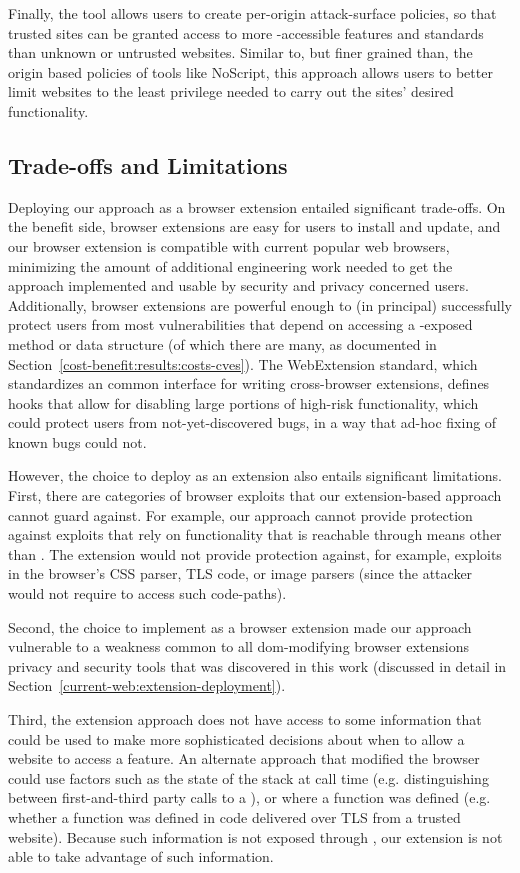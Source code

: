 Finally, the tool allows users to create per-origin attack-surface policies,
so that trusted sites can be granted access to more \JS-accessible
features and standards than unknown or untrusted websites.  Similar to, but
finer grained than, the origin based policies of tools like NoScript, this
approach allows users to better limit websites to the least privilege
needed to carry out the sites' desired functionality.


\subsection{Trade-offs and Limitations}
Deploying our approach as a browser extension entailed significant trade-offs.
On the benefit side, browser extensions are easy for users to install and update,
and our browser extension is compatible with current popular web browsers,
minimizing the amount of additional engineering work needed to get the approach
implemented and usable by security and privacy concerned users.  Additionally,
browser extensions are powerful enough to (in principal) successfully protect
users from most vulnerabilities that depend on accessing a \JS-exposed method
or data structure (of which there are many, as documented in
Section~\ref{cost-benefit:results:costs-cves}).  The WebExtension standard, which
standardizes an common interface for writing cross-browser extensions,
defines hooks that allow for disabling large portions of high-risk
functionality, which could protect users from not-yet-discovered bugs, in a way
that ad-hoc fixing of known bugs could not.

However, the choice to deploy as an extension also entails significant
limitations.  First, there are categories of browser exploits
that our extension-based approach cannot guard against.  For example, our
approach cannot provide protection against exploits that rely on \WAPI
functionality that is reachable through means other than \JS.
The extension would not provide protection against, for example,
exploits in the browser's CSS parser, TLS code, or image parsers (since the
attacker would not require \JS to access such code-paths).

Second, the choice to implement as a browser extension made our approach
vulnerable to a weakness common to all \gls{dom}-modifying browser extensions
privacy and security tools that was discovered in this work (discussed in
detail in Section~\ref{current-web:extension-deployment}).

Third, the extension approach does not have access to some
information that could be used to make more sophisticated decisions about
when to allow a website to access a feature.  An alternate approach that
modified the browser could use factors such as the state of the stack at call
time (e.g. distinguishing between first-and-third party calls to a \WAS), or
where a function was defined (e.g. whether a function was defined in \JS code
delivered over TLS from a trusted website).  Because such information is not
exposed through \JS, our extension is not able to take advantage of
such information.


